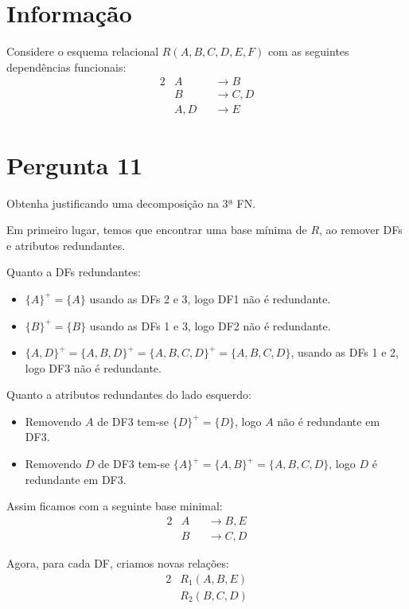 {\section*{Informação}
Considere o esquema relacional $R(A,B,C,D,E,F)$ com as seguintes dependências funcionais:
\begin{alignat*}{2}
    & A    && \rightarrow B    \\
    & B    && \rightarrow C, D \\
    & A, D && \rightarrow E
\end{alignat*}

\section{Pergunta 11}
Obtenha justificando uma decomposição na 3ª FN.

\ansseparator

Em primeiro lugar, temos que encontrar uma base mínima de $R$, ao remover DFs e atributos redundantes.

Quanto a DFs redundantes:
\begin{itemize}
    \item $\{A\}^+ = \{A\}$ usando as DFs 2 e 3, logo DF1 não é redundante.
    \item $\{B\}^+ = \{B\}$ usando as DFs 1 e 3, logo DF2 não é redundante.
    \item $\{A,D\}^+ = \{A,B,D\}^+ = \{A,B,C,D\}^+ = \{A,B,C,D\}$, usando as DFs 1 e 2, logo DF3 não é redundante.
\end{itemize}
Quanto a atributos redundantes do lado esquerdo:
\begin{itemize}
    \item Removendo $A$ de DF3 tem-se $\{D\}^+ = \{D\}$, logo $A$ não é redundante em DF3.
    \item Removendo $D$ de DF3 tem-se $\{A\}^+ = \{A,B\}^+ = \{A,B,C,D\}$, logo $D$ é redundante em DF3.
\end{itemize}
Assim ficamos com a seguinte base minimal:
\begin{alignat*}{2}
    & A && \rightarrow B, E \\
    & B && \rightarrow C, D
\end{alignat*}

Agora, para cada DF, criamos novas relações:
\begin{alignat*}{2}
    & R_1 (A, B, E) \\
    & R_2 (B, C, D)
\end{alignat*}

}
